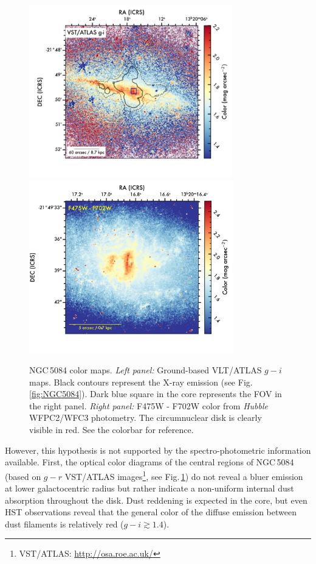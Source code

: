 \documentclass[modern]{CORE-AAS/aastex631}
\begin{document}
\begin{figure}[t!]
\begin{center}
\includegraphics[trim={0 20 40 0}, clip,  height = 7.5cm]{FIGURES/NGC5084_gi.png}
\includegraphics[trim={30 20 0 0}, clip,  height = 7.5cm]{FIGURES/NGC5084_F475W_F702W.png}
\caption{NGC\,5084 color maps. \emph{Left panel:} Ground-based VLT/ATLAS $g-i$ maps. Black contours represent the X-ray emission (see Fig.\,\ref{fig:NGC5084}). Dark blue square in the core represents the FOV in the right panel. \emph{Right panel:} F475W - F702W color from \emph{Hubble} WFPC2/WFC3 photometry. The circumnuclear disk is clearly visible in red. See the colorbar for reference.} 
\label{fig:NGC5084_color}
\end{center}
\end{figure}
However, this hypothesis is not supported by the spectro-photometric information available. First, the optical color diagrams of the central regions of NGC\,5084 (based on $g-r$ VST/ATLAS images\footnote{VST/ATLAS: \url{http://osa.roe.ac.uk/}}, see Fig.\,\ref{fig:NGC5084_color}) do not reveal a bluer emission at lower galactocentric radius but rather indicate a non-uniform internal dust absorption throughout the disk. Dust reddening is expected in the core, but even HST observations reveal that the general color of the diffuse emission between dust filaments is relatively red ($g-i\gtrsim1.4$).
\end{document}
